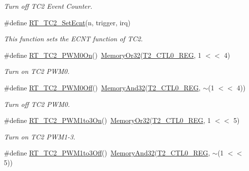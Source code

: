 \begin{DoxyCompactItemize}
\begin{DoxyCompactList}\small\item\em Turn off T\+C2 Event Counter. \end{DoxyCompactList}\item 
\#define \mbox{\hyperlink{a00047_af07bf5769df0423324194f22e008e832}{R\+T\+\_\+\+T\+C2\+\_\+\+Set\+Ecnt}}(n,  trigger,  irq)
\begin{DoxyCompactList}\small\item\em This function sets the E\+C\+NT function of T\+C2. \end{DoxyCompactList}\item 
\#define \mbox{\hyperlink{a00047_abaff3048e72dc0cb912c898a0a4c4e14}{R\+T\+\_\+\+T\+C2\+\_\+\+P\+W\+M0\+On}}()~\mbox{\hyperlink{a00020_a27874a97deab7cecdde5ddecf466e31e}{Memory\+Or32}}(\mbox{\hyperlink{a00020_adadaa0ab1ebbd7ba9b70dfd24c3ed44daf2e9deb36631241181cbf09e8d959475}{T2\+\_\+\+C\+T\+L0\+\_\+\+R\+EG}}, 1 $<$$<$ 4)
\begin{DoxyCompactList}\small\item\em Turn on T\+C2 P\+W\+M0. \end{DoxyCompactList}\item 
\#define \mbox{\hyperlink{a00047_a52f984fc9f5bc4d1821025ad8d75f3c9}{R\+T\+\_\+\+T\+C2\+\_\+\+P\+W\+M0\+Off}}()~\mbox{\hyperlink{a00020_ad87cedffcaadc51db22594fce55173d4}{Memory\+And32}}(\mbox{\hyperlink{a00020_adadaa0ab1ebbd7ba9b70dfd24c3ed44daf2e9deb36631241181cbf09e8d959475}{T2\+\_\+\+C\+T\+L0\+\_\+\+R\+EG}}, $\sim$(1 $<$$<$ 4))
\begin{DoxyCompactList}\small\item\em Turn off T\+C2 P\+W\+M0. \end{DoxyCompactList}\item 
\#define \mbox{\hyperlink{a00047_adc090dee2463a2a27b57234e63f0c0b5}{R\+T\+\_\+\+T\+C2\+\_\+\+P\+W\+M1to3\+On}}()~\mbox{\hyperlink{a00020_a27874a97deab7cecdde5ddecf466e31e}{Memory\+Or32}}(\mbox{\hyperlink{a00020_adadaa0ab1ebbd7ba9b70dfd24c3ed44daf2e9deb36631241181cbf09e8d959475}{T2\+\_\+\+C\+T\+L0\+\_\+\+R\+EG}}, 1 $<$$<$ 5)
\begin{DoxyCompactList}\small\item\em Turn on T\+C2 P\+W\+M1-\/3. \end{DoxyCompactList}\item 
\#define \mbox{\hyperlink{a00047_adec1566e2c2a16ab922163a22f3c99df}{R\+T\+\_\+\+T\+C2\+\_\+\+P\+W\+M1to3\+Off}}()~\mbox{\hyperlink{a00020_ad87cedffcaadc51db22594fce55173d4}{Memory\+And32}}(\mbox{\hyperlink{a00020_adadaa0ab1ebbd7ba9b70dfd24c3ed44daf2e9deb36631241181cbf09e8d959475}{T2\+\_\+\+C\+T\+L0\+\_\+\+R\+EG}}, $\sim$(1 $<$$<$ 5))

\end{DoxyCompactItemize}
